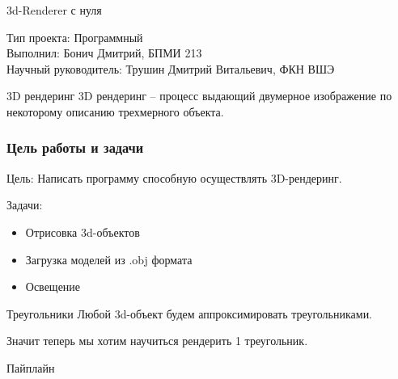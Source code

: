 \documentclass{beamer}
\title{}
\date{2023}
\author{Бонич Дмитрий}
\begin{document}
\begin{frame}
\begin{center}


{\large \scshape

\bigskip

\bigskip

3d-Renderer с нуля

\bigskip
\bigskip
\bigskip
\bigskip
\bigskip
\bigskip
}

Тип проекта: Программный\\
\bigskip
Выполнил: Бонич Дмитрий, БПМИ 213\\
\bigskip
Научный руководитель: Трушин Дмитрий Витальевич, ФКН ВШЭ 

\end{center}
\end{frame}

\begin{frame}{3D рендеринг}
    3D рендеринг -- процесс выдающий 
    двумерное изображение по некоторому описанию трехмерного объекта.
\end{frame}

\begin{frame}

\frametitle{Цель работы и задачи}

Цель: Написать программу способную осуществлять 3D-рендеринг.

\bigskip

Задачи:
\begin{itemize}
    \item Отрисовка 3d-объектов
    \item Загрузка моделей из .obj формата
    \item Освещение
\end{itemize}

\end{frame}

\begin{frame}{Треугольники}
Любой 3d-объект будем аппроксимировать треугольниками.

Значит теперь мы хотим научиться рендерить 1 треугольник.

\end{frame}

\begin{frame}{Пайплайн}

\end{frame}
\end{document}
